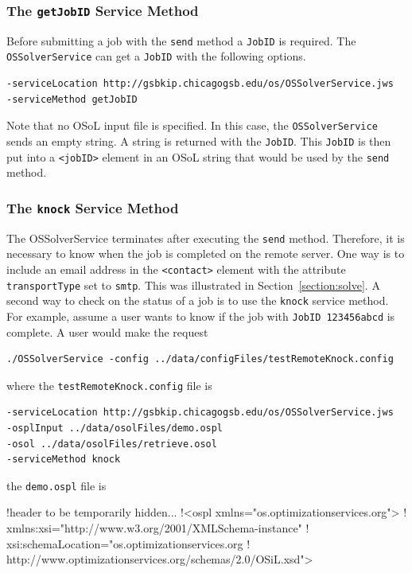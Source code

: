 \documentclass[11pt]{article}
\renewcommand{\_}{{\char"5F}}
\renewcommand{\{}{{\char"7B}}
\renewcommand{\}}{{\char"7D}}
\renewcommand{\^}{{\char"0D}}
\renewcommand{\'}{{\char"0D}}
\begin{document}
\begin{enumerate}[Step 1:]
\subsubsection{The  {\tt getJobID} Service Method}\label{section:getjobid}

Before  submitting a job with the {\tt send} method a {\tt JobID}
is required. The {\tt OSSolverService} can get a {\tt JobID} with the following options.
\begin{verbatim}
-serviceLocation http://gsbkip.chicagogsb.edu/os/OSSolverService.jws
-serviceMethod getJobID
\end{verbatim}
Note that no OSoL input file is specified. In this case, the {\tt OSSolverService} sends an empty string.
A string is returned with the {\tt JobID}. This {\tt JobID} is then put into a {\tt <jobID>} element in an
OSoL string that would be used by the {\tt send} method.


\subsubsection{The  {\tt knock} Service Method}\label{section:knock}

The OSSolverService terminates after executing the {\tt send} method. Therefore,
it is necessary to know when the job is completed on the remote server. One way is to include an email
address in the  {\tt <contact>}  element with the attribute {\tt transportType} set to {\tt smtp}.
This was illustrated in Section~\ref{section:solve}.  A second way to check on the status of a job is
to use the {\tt knock} service method.  For example, assume a user   wants to know if  the job
with {\tt JobID 123456abcd}  is complete. A user would make the request
\begin{verbatim}
./OSSolverService -config ../data/configFiles/testRemoteKnock.config
\end{verbatim}
where the {\tt testRemoteKnock.config} file is
\begin{verbatim}
-serviceLocation http://gsbkip.chicagogsb.edu/os/OSSolverService.jws
-osplInput ../data/osolFiles/demo.ospl
-osol ../data/osolFiles/retrieve.osol
-serviceMethod knock
\end{verbatim}
the {\tt demo.ospl} file is

!header to be temporarily hidden...
!<ospl xmlns="os.optimizationservices.org">
!      xmlns:xsi="http://www.w3.org/2001/XMLSchema-instance"
!      xsi:schemaLocation="os.optimizationservices.org
!      http://www.optimizationservices.org/schemas/2.0/OSiL.xsd">


\end{enumerate}
\end{document}
